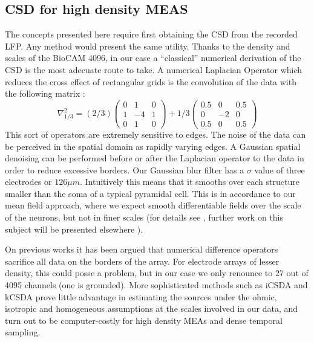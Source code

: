 \documentclass{article}
\begin{document}
\subsection{CSD for high density MEAS}

The concepts presented here require first obtaining the CSD from the recorded LFP. Any method would present the same utility. Thanks to the density and scales of the BioCAM 4096, in our case a ``classical'' numerical derivation of the CSD is the most adecuate route to take. A numerical Laplacian Operator which reduces the cross effect of rectangular grids is the convolution of the data with the following matrix \cite{Lindberg90}:
\begin{equation}
\nabla^2_{1/3}=(2/3)
\begin{pmatrix}
  0 & 1 & 0 \\
  1 & -4 & 1 \\
  0 & 1 & 0
\end{pmatrix}
+1/3
\begin{pmatrix}
  0.5 & 0 & 0.5 \\
  0 & -2 & 0 \\
  0.5 & 0 & 0.5
\end{pmatrix}  
\end{equation}
This sort of operators are extremely sensitive to edges. The noise of the data can be perceived in the spatial domain as rapidly varying edges. A Gaussian spatial denoising can be performed before or after the Laplacian operator to the data in order to reduce excessive borders. Our Gaussian blur filter has a $\sigma$ value of three electrodes or $126 \mu m$. Intuitively this means that it smooths over each structure smaller than the soma of a typical pyramidal cell. 
This is  in accordance to our mean field approach, where we expect smooth differentiable fields over the scale of the neurons, but not in finer scales (for details see \cite{Bedard11}, further work on this subject will be presented elsewhere \cite{IsabelYo}).

On previous works it has been argued that numerical difference operators sacrifice all data on the borders of the array. For electrode arrays of lesser density, this could posse a problem, but in our case we only renounce to 27 out of 4095 channels (one is grounded). More sophisticated methods such as iCSDA \cite{Leski2011} and kCSDA \cite{Potworowski2011} prove little advantage in estimating the sources under the ohmic, isotropic and homogeneous assumptions at the scales involved in our data, and turn out to be computer-costly for high density MEAs and dense temporal sampling.  
\end{document}
